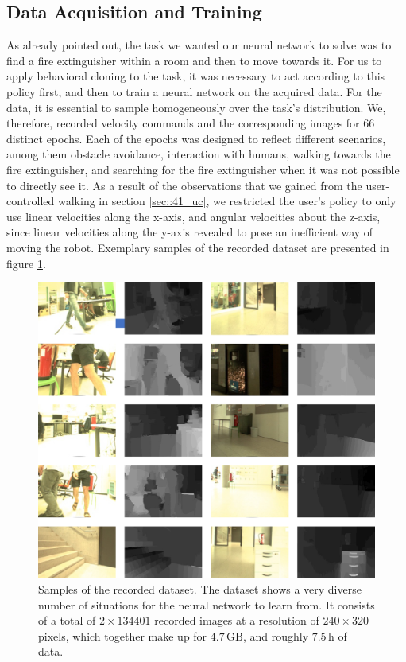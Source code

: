 \subsection{Data Acquisition and Training}
\label{sec::423_da}
As already pointed out, the task we wanted our neural network to solve was to find a fire extinguisher within a room and then to move towards it. For us to apply behavioral cloning to the task, it was necessary to act according to this policy first, and then to train a neural network on the acquired data. For the data, it is essential to sample homogeneously over the task's distribution. We, therefore, recorded velocity commands and the corresponding images for 66 distinct epochs. Each of the epochs was designed to reflect different scenarios, among them obstacle avoidance, interaction with humans, walking towards the fire extinguisher, and searching for the fire extinguisher when it was not possible to directly see it. As a result of the observations that we gained from the user-controlled walking in section \ref{sec::41_uc}, we restricted the user's policy to only use linear velocities along the x-axis, and angular velocities about the z-axis, since linear velocities along the y-axis revealed to pose an inefficient way of moving the robot. Exemplary samples of the recorded dataset are presented in figure \ref{fig::423_dataset}.
\begin{figure}[h!]
	\centering
	\includegraphics[scale=.4]{chapters/04_experiments/02_autonomous_walking/dataset_diversity.png}
	\caption{Samples of the recorded dataset. The dataset shows a very diverse number of situations for the neural network to learn from. It consists of a total of $2\times134401$ recorded images at a resolution of $240\times320$ pixels, which together make up for $4.7\,\text{GB}$, and roughly $7.5\,\text{h}$ of data.}
	\label{fig::423_dataset}
\end{figure}
